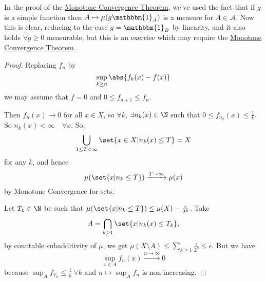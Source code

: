 \documentclass{article}
\newcommand{\1}[1]{\mathbbm{1}_{#1}}
\begin{document}
In the proof of the \hyperlink{def:monConv}{Monotone Convergence Theorem}, we've used the fact that if $g$ is a simple function then $A \mapsto \mu(g \1{A})$ is a measure for $A \in \mathcal{A}$.
Now this is clear, reducing to the case $g = \1B$ by linearity, and it also holds $\forall g \geq 0$ measurable, but this is an exercise which may require the \hyperlink{def:monConv}{Monotone Convergence Theorem}.


\begin{proof}
    Replacing $f_n$ by
    \begin{equation*}
        \sup_{k \geq n} \abs{f_k(x) - f(x)}
    \end{equation*}
    we may assume that $f = 0$ and $0 \leq f_{n+1} \leq f_n$.

    Then $f_n(x) \to 0$ for all $x \in X$, so $\forall k$, $\exists n_k(x) \in \N$ such that $0 \leq f_{n_k}(x) \leq \frac{1}{k}$.
    So $n_k(x) < \infty \quad \forall x$.
    So,
    \begin{equation*}
        \bigcup_{1 \leq T < \infty} \set{x \in X | n_k(x) \leq T} = X
    \end{equation*}
    for any $k$, and hence
    \begin{equation*}
        \mu(\set{x | n_k \leq T}) \xrightarrow{T\to\infty} \mu(x)
    \end{equation*}
    by Monotone Convergence for sets.

    Let $T_k \in \N$ be such that $\mu(\set{x | n_k \leq T}) \leq \mu(X) - \frac{\epsilon}{2^k}$.
    Take
    \begin{equation*}A = \bigcap_{k \geq 1} \set{x | n_k(x) \leq T_k},\end{equation*}
    by countable subadditivity of $\mu$, we get $\mu(X \setminus A) \leq \sum_{k \geq 1} \frac{\epsilon}{2^k} \leq \epsilon$.
    But we have
    \begin{equation*}\sup_{x \in A} f_n(x) \xrightarrow{n \to \infty} 0\end{equation*}
    because $\sup_A f_{T_k} \leq \frac{1}{k}\ \forall k$ and $n \mapsto \sup_A f_n$ is non-increasing.
\end{proof}
\end{document}
